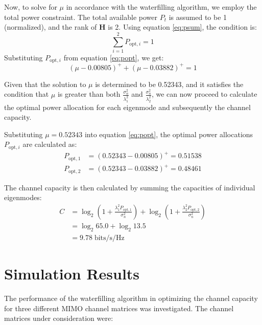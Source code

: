 \documentclass[lettersize,journal]{IEEEtran}
\begin{document}
Now, to solve for \( \mu \) in accordance with the waterfilling algorithm, we employ the total power constraint. The total available power \( P_t \) is assumed to be 1 (normalized), and the rank of \( \mathbf{H} \) is 2. Using equation \eqref{eq:psum}, the condition is:
\begin{equation}
\sum_{i=1}^{2} P_{\text{opt},i} = 1
\end{equation}
Substituting \( P_{\text{opt},i} \) from equation \eqref{eq:popt}, we get:
\begin{equation}
\left( \mu - 0.00805 \right)^+ + \left( \mu - 0.03882 \right)^+ = 1
\end{equation}

Given that the solution to \( \mu \) is determined to be 0.52343, and it satisfies the condition that \( \mu \) is greater than both \( \frac{\sigma_n^2}{\lambda_1^2} \) and \( \frac{\sigma_n^2}{\lambda_2^2} \), we can now proceed to calculate the optimal power allocation for each eigenmode and subsequently the channel capacity.

Substituting \( \mu = 0.52343 \) into equation \eqref{eq:popt}, the optimal power allocations \( P_{\text{opt},i} \) are calculated as:
\begin{equation}
\begin{aligned}
P_{\text{opt},1} &= \left( 0.52343 - 0.00805 \right)^+ = 0.51538 \\
P_{\text{opt},2} &= \left( 0.52343 - 0.03882 \right)^+ = 0.48461
\end{aligned}
\end{equation}

The channel capacity is then calculated by summing the capacities of individual eigenmodes:
\begin{equation}
\begin{aligned}
C &= \log_2\left(1 + \frac{\lambda_1^2 P_{\text{opt},1}}{\sigma_n^2}\right) + \log_2\left(1 + \frac{\lambda_2^2 P_{\text{opt},2}}{\sigma_n^2}\right)\\
&= \log_2 65.0 + \log_2 13.5\\
&= 9.78 \; \text{bits/s/Hz}
\end{aligned}
\end{equation}

\section{Simulation Results}

The performance of the waterfilling algorithm in optimizing the channel capacity for three different MIMO channel matrices was investigated. The channel matrices under consideration were:
\end{document}
